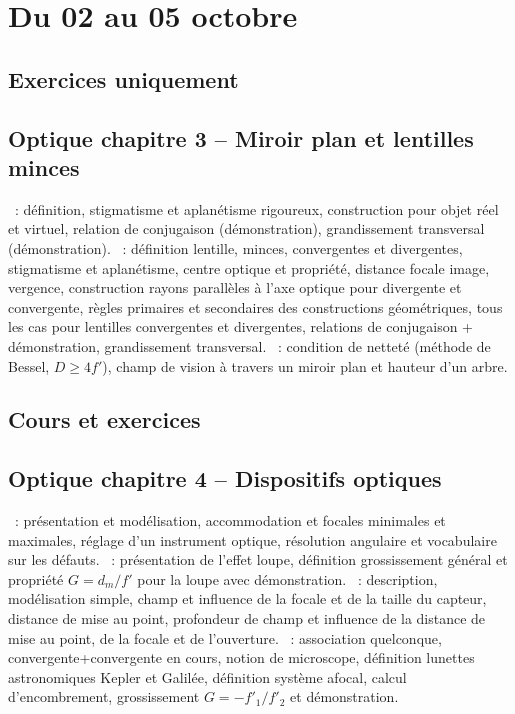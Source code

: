 \documentclass[a4paper, 12pt, final, garamond]{book}
\begin{document}
\setcounter{chapter}{2}

\chapter{Du 02 au 05 octobre}

\section{Exercices uniquement}

\section*{Optique chapitre 3 -- Miroir plan et lentilles minces}
\begin{enumerate}[label=\Roman*]
    ~: définition, stigmatisme et aplanétisme
        rigoureux, construction pour objet réel et virtuel, relation de
        conjugaison (démonstration), grandissement transversal (démonstration).
    ~: définition lentille, minces, convergentes
        et divergentes, stigmatisme et aplanétisme, centre optique et propriété,
        distance focale image, vergence, construction rayons parallèles à l'axe
        optique pour divergente et convergente, règles primaires et secondaires
        des constructions géométriques, tous les cas pour lentilles convergentes
        et divergentes, relations de conjugaison + démonstration, grandissement
        transversal.
    ~: condition de netteté (méthode de
        Bessel, $D \geq 4f'$), champ de vision à travers un miroir plan et
        hauteur d'un arbre.
\end{enumerate}

\section{Cours et exercices}

\section*{Optique chapitre 4 -- Dispositifs optiques}
\begin{enumerate}[label=\Roman*]
    ~: présentation et modélisation, accommodation et
        focales minimales et maximales, réglage d'un instrument optique,
        résolution angulaire et vocabulaire sur les défauts.
    ~: présentation de l'effet loupe, définition
        grossissement général et propriété $G = d_m/f'$ pour la loupe avec
        démonstration.
    ~: description, modélisation simple, champ et
        influence de la focale et de la taille du capteur, distance de mise au
        point, profondeur de champ et influence de la distance de mise au point,
        de la focale et de l'ouverture.
    ~: association
        quelconque, convergente+convergente en cours, notion de microscope,
        définition lunettes astronomiques Kepler et Galilée, définition système
        afocal, calcul d'encombrement, grossissement $G=-f'_1/f'_2$ et
        démonstration.
\end{enumerate}
\end{document}
